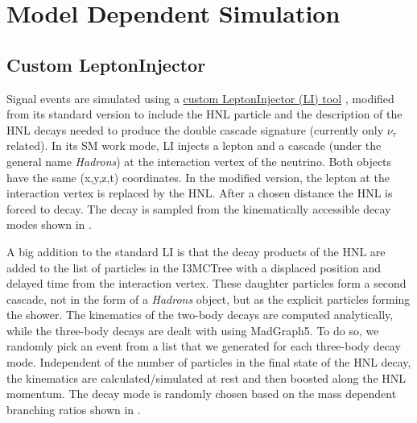 


\section{Model Dependent Simulation} 



\subsection{Custom LeptonInjector} 

Signal events are simulated using a \href{https://github.com/LeanderFischer/LeptonInjector-HNL/tree/main/LeptonInjector}{custom LeptonInjector (LI) tool} , modified from its standard version to include the HNL particle and the description of the HNL decays needed to produce the double cascade signature (currently only $\nu_{\tau}$ related). In its SM work mode, LI injects a lepton and a cascade (under the general name \textit{Hadrons}) at the interaction vertex of the neutrino. Both objects have the same (x,y,z,t) coordinates. In the modified version, the lepton at the interaction vertex is replaced by the HNL. After a chosen distance the HNL is forced to decay. The decay is sampled from the kinematically accessible decay modes shown in .

A big addition to the standard LI is that the decay products of the HNL are added to the list of particles in the I3MCTree with a displaced position and delayed time from the interaction vertex. These daughter particles form a second cascade, not in the form of a \textit{Hadrons} object, but as the explicit particles forming the shower. The kinematics of the two-body decays are computed analytically, while the three-body decays are dealt with using MadGraph5. To do so, we randomly pick an event from a list that we generated for each three-body decay mode. Independent of the number of particles in the final state of the HNL decay, the kinematics are calculated/simulated at rest and then boosted along the HNL momentum. The decay mode is randomly chosen based on the mass dependent branching ratios shown in .

